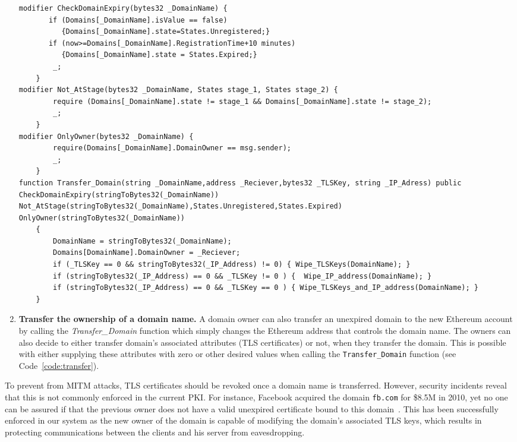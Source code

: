 \begin{enumerate}
\begin{lstlisting}[basicstyle=\scriptsize\ttfamily,caption={\texttt{Transfer\_Domain} function of  \Ghazalstar smart contract.}, label={code:transfer}]
modifier CheckDomainExpiry(bytes32 _DomainName) {
       if (Domains[_DomainName].isValue == false) 
          {Domains[_DomainName].state=States.Unregistered;} 
       if (now>=Domains[_DomainName].RegistrationTime+10 minutes)
          {Domains[_DomainName].state = States.Expired;} 
        _;
    }
modifier Not_AtStage(bytes32 _DomainName, States stage_1, States stage_2) {
        require (Domains[_DomainName].state != stage_1 && Domains[_DomainName].state != stage_2);
        _;
    }
modifier OnlyOwner(bytes32 _DomainName) {
        require(Domains[_DomainName].DomainOwner == msg.sender);
        _;
    }        
function Transfer_Domain(string _DomainName,address _Reciever,bytes32 _TLSKey, string _IP_Adress) public 
CheckDomainExpiry(stringToBytes32(_DomainName)) 
Not_AtStage(stringToBytes32(_DomainName),States.Unregistered,States.Expired) 
OnlyOwner(stringToBytes32(_DomainName))
    {
        DomainName = stringToBytes32(_DomainName);
        Domains[DomainName].DomainOwner = _Reciever;
        if (_TLSKey == 0 && stringToBytes32(_IP_Address) != 0) { Wipe_TLSKeys(DomainName); }
        if (stringToBytes32(_IP_Address) == 0 && _TLSKey != 0 ) {  Wipe_IP_address(DomainName); }
        if (stringToBytes32(_IP_Address) == 0 && _TLSKey == 0 ) { Wipe_TLSKeys_and_IP_address(DomainName); }
    }
\end{lstlisting}

\item \textbf{Transfer the ownership of a domain name.} A domain owner can also transfer an unexpired domain to the new Ethereum account by calling the \textit{Transfer\_Domain} function which simply changes the Ethereum address that controls the domain name. The owners can also decide to either transfer domain's associated attributes (\eg TLS certificates) or not, when they transfer the domain. This is possible with either supplying these attributes with zero or other desired values when calling the \texttt{Transfer\_Domain} function (see Code~\ref{code:transfer}).

\end{enumerate}

To prevent from MITM attacks, TLS certificates should be revoked once a domain name is transferred. However, security incidents reveal that this is not commonly enforced in the current PKI. For instance, Facebook acquired the domain \texttt{fb.com} for \$8.5M in 2010, yet no one can be assured if that the previous owner does not have a valid unexpired certificate bound to this domain~\cite{CO13}. This has been successfully enforced in our system as the new owner of the domain is capable of modifying the domain's associated TLS keys, which results in protecting communications between the clients and his server from eavesdropping.

